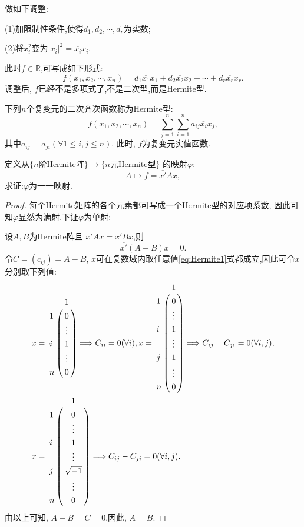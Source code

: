 做如下调整:

(1)加限制性条件,使得$d_1,d_2,\cdots,d_r$为实数;

(2)将$x_i^2$变为$|x_i|^2=\overline{x_i}x_i$.

此时$f \in \mathbb{R}$,可写成如下形式:
\[
  f(x_1,x_2,\cdots,x_n)=d_1\overline{x_1}x_1+d_2\overline{x_2}x_2+\cdots+d_r\overline{x_r}x_r.
\]
调整后, $f$已经不是多项式了,不是二次型,而是Hermite型.

\begin{definition}
  下列$n$个复变元的二次齐次函数称为Hermite型:
  \[
    f(x_1,x_2,\cdots,x_n) = \sum_{j=1}^n\sum_{i=1}^na_{ij}\overline{x_i}x_j,
  \]
  其中$\overline{a_{ij}}=a_{ji} ( \forall 1 \leq i, j \leq n)$.
  此时, $f$为复变元实值函数.
\end{definition}

\begin{theory}
  定义从$\{n\text{阶Hermite阵}\}\longrightarrow \{n\text{元Hermite型}\}$
  的映射$\varphi$:
  \[
    A \mapsto f=\overline{x'}Ax,
  \]
  求证:$\varphi$为一一映射.
\end{theory}

\begin{proof}
  每个Hermite矩阵的各个元素都可写成一个Hermite型的对应项系数,
  因此可知$\varphi$显然为满射.下证$\varphi$为单射:

  设$A, B$为Hermite阵且
  $\overline{x'}Ax=\overline{x'}Bx$,则
  \begin{equation}\label{eq:Hermite1}
    \overline{x'}(A-B)x=0.
  \end{equation}
  令$C=(c_{ij})=A-B$,
  $x$可在复数域内取任意值\eqref{eq:Hermite1}式都成立,因此可令$x$分别取下列值:
  \begin{align*}
    & x=
    \bordermatrix{
      ~&1\cr
         1&0\cr
            ~&\vdots\cr
               i&1\cr
                  ~&\vdots\cr
                     n&0} \Longrightarrow C_{ii}=0 (\forall i),
    x=
    \bordermatrix{
      ~&1\cr
         1&0\cr
            ~&\vdots\cr
               i&1\cr
                  ~&\vdots\cr
                     j&1\cr
                        ~&\vdots\cr
                           n&0} \Longrightarrow
                              C_{ij}+C_{ji}=0 (\forall i,j),\\
    & x=
    \bordermatrix{
      ~&1\cr
         1&0\cr
            ~&\vdots\cr
               i&1\cr
                  ~&\vdots\cr
                     j&\sqrt{-1}\cr
                        ~&\vdots\cr
                           n&0} \Longrightarrow
                              C_{ij}-C_{ji}=0 (\forall i,j).
  \end{align*}
  由以上可知, $A-B=C=0$,因此, $A=B$.
\end{proof}

